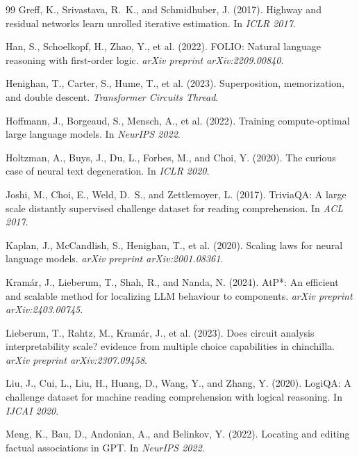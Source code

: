 \documentclass{article}
\begin{document}
\begin{thebibliography}{99}
Greff, K., Srivastava, R.~K., and Schmidhuber, J. (2017).
Highway and residual networks learn unrolled iterative estimation.
In \emph{ICLR 2017}.

Han, S., Schoelkopf, H., Zhao, Y., et al. (2022).
FOLIO: Natural language reasoning with first-order logic.
\emph{arXiv preprint arXiv:2209.00840}.

Henighan, T., Carter, S., Hume, T., et al. (2023).
Superposition, memorization, and double descent.
\emph{Transformer Circuits Thread}.

Hoffmann, J., Borgeaud, S., Mensch, A., et al. (2022).
Training compute-optimal large language models.
In \emph{NeurIPS 2022}.

Holtzman, A., Buys, J., Du, L., Forbes, M., and Choi, Y. (2020).
The curious case of neural text degeneration.
In \emph{ICLR 2020}.

Joshi, M., Choi, E., Weld, D.~S., and Zettlemoyer, L. (2017).
TriviaQA: A large scale distantly supervised challenge dataset for reading comprehension.
In \emph{ACL 2017}.

Kaplan, J., McCandlish, S., Henighan, T., et al. (2020).
Scaling laws for neural language models.
\emph{arXiv preprint arXiv:2001.08361}.

Kram\'{a}r, J., Lieberum, T., Shah, R., and Nanda, N. (2024).
AtP*: An efficient and scalable method for localizing LLM behaviour to components.
\emph{arXiv preprint arXiv:2403.00745}.

Lieberum, T., Rahtz, M., Kram\'{a}r, J., et al. (2023).
Does circuit analysis interpretability scale? evidence from multiple choice capabilities in chinchilla.
\emph{arXiv preprint arXiv:2307.09458}.

Liu, J., Cui, L., Liu, H., Huang, D., Wang, Y., and Zhang, Y. (2020).
LogiQA: A challenge dataset for machine reading comprehension with logical reasoning.
In \emph{IJCAI 2020}.

Meng, K., Bau, D., Andonian, A., and Belinkov, Y. (2022).
Locating and editing factual associations in GPT.
In \emph{NeurIPS 2022}.


\end{thebibliography}
\end{document}

